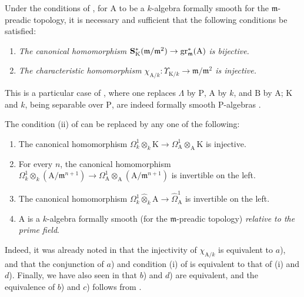 \begin{theorem}[22.2.2]
\label{0.22.2.2}
Under the conditions of , for $\mathrm{A}$ to be a $k$-algebra formally smooth for the $\mathfrak{m}$-preadic topology, it is necessary and sufficient that the following conditions be satisfied:
\begin{enumerate}
  \item[\rm{(i)}] \emph{The canonical homomorphism $\mathbf{S}^*_\mathrm{K}(\mathfrak{m}/\mathfrak{m}^2)\to\operatorname{gr}^*_\mathfrak{m}(\mathrm{A})$ is bijective.}
  \item[\rm{(ii)}] \emph{The characteristic homomorphism $\chi_{\mathrm{A}/k}:\Upsilon_{\mathrm{K}/k}\to\mathfrak{m}/\mathfrak{m}^2$ is injective.}
\end{enumerate}
This is a particular case of , where one replaces $\Lambda$ by $\mathrm{P}$, $\mathrm{A}$ by $k$, and $\mathrm{B}$ by $\mathrm{A}$; $\mathrm{K}$ and $k$, being separable over $\mathrm{P}$, are indeed formally smooth $\mathrm{P}$-algebras .
\end{theorem}

\begin{remark}[22.2.3]
\label{0.22.2.3}
The condition (ii) of  can be replaced by any one of the following:
\begin{enumerate}
  \item[a)] The canonical homomorphism $\Omega^1_k\otimes_k\mathrm{K}\to\Omega^1_\mathrm{A}\otimes_\mathrm{A}\mathrm{K}$ is injective.
  \item[b)] For every $n$, the canonical homomorphism $\Omega^1_k\otimes_k(\mathrm{A}/\mathfrak{m}^{n+1})\to\Omega^1_\mathrm{A}\otimes_\mathrm{A}(\mathrm{A}/\mathfrak{m}^{n+1})$ is invertible on the left.
  \item[c)] The canonical homomorphism $\Omega^1_k\widehat{\otimes}_k\mathrm{A}\to\widehat{\Omega}^1_\mathrm{A}$ is invertible on the left.
  \item[d)] $\mathrm{A}$ is a $k$-algebra formally smooth (for the $\mathfrak{m}$-preadic topology) \emph{relative to the prime field}.
\end{enumerate}
Indeed, it was already noted in  that the injectivity of $\chi_{\mathrm{A}/k}$ is equivalent to $a$), and that the conjunction of $a$) and condition (i) of  is equivalent to that of (i) and $d$).
Finally, we have also seen in  that $b$) and $d$) are equivalent, and the equivalence of $b$) and $c$) follows from .
\end{remark}

